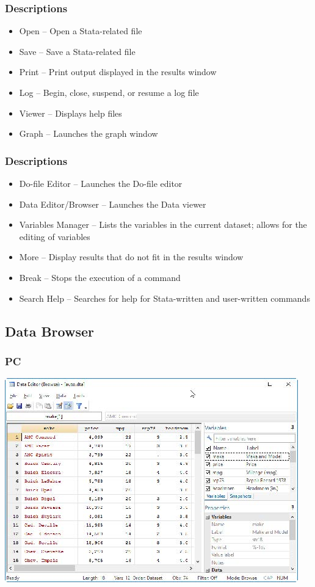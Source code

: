 \documentclass{beamer}
\begin{document}
\begin{frame}
	\frametitle{Descriptions}
		\begin{itemize}
			\item Open -- Open a Stata-related file
			\item Save -- Save a Stata-related file
			\item Print -- Print output displayed in the results window
			\item Log -- Begin, close, suspend, or resume a log file
			\item Viewer -- Displays help files
			\item Graph -- Launches the graph window
		\end{itemize}
\end{frame}

\begin{frame}
	\frametitle{Descriptions}
		\begin{itemize}
			\item Do-file Editor -- Launches the Do-file editor
			\item Data Editor/Browser -- Launches the Data viewer
			\item Variables Manager -- Lists the variables in the current dataset; allows for the editing of variables
			\item More -- Display results that do not fit in the results window
			\item Break -- Stops the execution of a command
			\item Search Help -- Searches for help for Stata-written and user-written commands
		\end{itemize}
\end{frame}

\subsection{Data Browser}

\begin{frame}
	\frametitle{PC}
		\includegraphics[scale=0.75]{data_editor_pc}
\end{frame}
\end{document}

